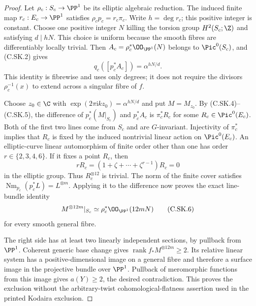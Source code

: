 \begin{proof}
Let $\rho_c:S_c\to\PP^1$ be its elliptic algebraic
reduction. The induced finite map $r_c:E_c\to\PP^1$
satisfies $\rho_c p_c=r_c\pi_c$. Write $h=\deg r_c$;
this positive integer is constant. Choose one positive
integer $N$ killing the torsion group $H^2(S_c;\Z)$
and satisfying $d\mid hN$. This choice is uniform
because the smooth fibres are differentiably locally
trivial. Then
$A_c=\rho_c^*\OO_{\PP^1}(N)$ belongs to $\Pic^0(S_c)$,
and (C.SK.2) gives
\[
 q_c([p_c^*A_c])=\alpha^{hN/d}.
\tag{C.SK.5}
\]
This identity is fibrewise and uses only degrees; it
does not require the divisors $\rho_c^{-1}(x)$ to
extend across a singular fibre of $f$.

Choose $z_0\in\C$ with
$\exp(2\pi\mathrm i k z_0)=\alpha^{hN/d}$ and put
$M=M_{z_0}$. By (C.SK.4)--(C.SK.5), the difference of
$p_c^*(M|_{S_c})$ and $p_c^*A_c$ is
$\pi_c^*R_c$ for some $R_c\in\Pic^0(E_c)$.
Both of the first two lines come from $S_c$ and are
$G$-invariant. Injectivity of $\pi_c^*$ implies that
$R_c$ is fixed by the induced nontrivial linear action
on $\Pic^0(E_c)$. An elliptic-curve linear automorphism
of finite order other than one has order
$r\in\{2,3,4,6\}$. If it fixes a point $R_c$, then
\[
 rR_c=(1+\zeta+\cdots+\zeta^{r-1})R_c=0
\]
in the elliptic group. Thus $R_c^{\otimes12}$ is
trivial. The norm of the finite cover satisfies
$\operatorname{Nm}_{p_c}(p_c^*L)=L^{\otimes m}$.
Applying it to the difference now proves the exact
line-bundle identity
\[
 M^{\otimes12m}|_{S_c}
       \simeq \rho_c^*\OO_{\PP^1}(12mN)
\tag{C.SK.6}
\]
for every smooth general fibre.

The right side has at least two linearly independent
sections, by pullback from $\PP^1$. Coherent generic
base change gives
$\operatorname{rank}f_*M^{\otimes12m}\ge2$.
Its relative linear system has a positive-dimensional
image on a general fibre and therefore a surface
image in the projective bundle over $\PP^1$.
Pullback of meromorphic functions from this image
gives $a(Y)\ge2$, the desired contradiction.
This proves the exclusion without the arbitrary-twist
cohomological-flatness assertion used in the printed
Kodaira exclusion.
\end{proof}

